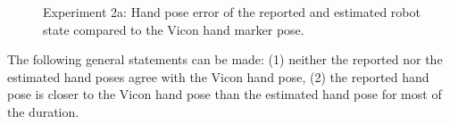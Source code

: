 \begin{figure}[h]
\centering
{}


\caption[Arm movement, hand pose error]{Experiment 2a: Hand pose error of the reported and estimated robot state compared to the Vicon hand marker pose.}
\label{fig:vic_error_arm_movement}
\end{figure}

The following general statements can be made: (1) neither the reported nor the estimated hand poses agree with the Vicon hand pose, (2) the reported hand pose is closer to the Vicon hand pose than the estimated hand pose for most of the duration.

